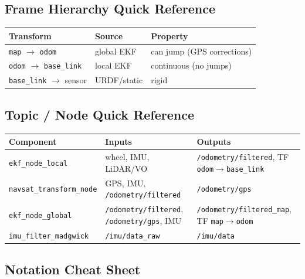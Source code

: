 \documentclass[11pt,a4paper]{article}
\begin{document}
\subsection{Frame Hierarchy Quick Reference}

\begin{center}
\begin{tabular}{lll}
\toprule
\textbf{Transform} & \textbf{Source} & \textbf{Property}\\
\midrule
\texttt{map} $\to$ \texttt{odom} & global EKF & can jump (GPS corrections)\\
\texttt{odom} $\to$ \texttt{base\_link} & local EKF & continuous (no jumps)\\
\texttt{base\_link} $\to$ sensor & URDF/static & rigid\\
\bottomrule
\end{tabular}
\end{center}

\subsection{Topic / Node Quick Reference}

\begin{center}
\footnotesize
\begin{tabular}{lll}
\toprule
\textbf{Component} & \textbf{Inputs} & \textbf{Outputs}\\
\midrule
\texttt{ekf\_node\_local} & wheel, IMU, LiDAR/VO & \texttt{/odometry/filtered}, TF \texttt{odom}$\to$\texttt{base\_link}\\
\texttt{navsat\_transform\_node} & GPS, IMU, \texttt{/odometry/filtered} & \texttt{/odometry/gps}\\
\texttt{ekf\_node\_global} & \texttt{/odometry/filtered}, \texttt{/odometry/gps}, IMU & \texttt{/odometry/filtered\_map}, TF \texttt{map}$\to$\texttt{odom}\\
\texttt{imu\_filter\_madgwick} & \texttt{/imu/data\_raw} & \texttt{/imu/data}\\
\bottomrule
\end{tabular}
\end{center}

\subsection{Notation Cheat Sheet}
\end{document}
